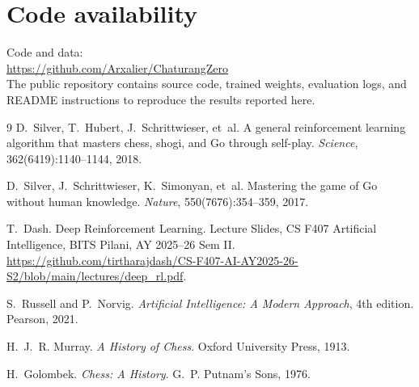 \documentclass[11pt,a4paper,twocolumn]{article}
\newcommand{\githuburl}{https://github.com/Arxalier/ChaturangZero}
\begin{document}
\section*{Code availability}
\noindent Code and data:\\
\url{\githuburl}\\
The public repository contains source code, trained weights, evaluation logs, and README instructions to reproduce the results reported here.

\begin{thebibliography}{9}
\small
{}
D.~Silver, T.~Hubert, J.~Schrittwieser, et~al.
\newblock A general reinforcement learning algorithm that masters chess, shogi, and Go through self-play.
\newblock \emph{Science}, 362(6419):1140--1144, 2018.

D.~Silver, J.~Schrittwieser, K.~Simonyan, et~al.
\newblock Mastering the game of Go without human knowledge.
\newblock \emph{Nature}, 550(7676):354--359, 2017.

T.~Dash.
\newblock Deep Reinforcement Learning.
\newblock Lecture Slides, CS F407 Artificial Intelligence, BITS Pilani, AY 2025--26 Sem II.
\newblock \url{https://github.com/tirtharajdash/CS-F407-AI-AY2025-26-S2/blob/main/lectures/deep_rl.pdf}.

S.~Russell and P.~Norvig.
\newblock \emph{Artificial Intelligence: A Modern Approach}, 4th edition.
\newblock Pearson, 2021.

H.~J.~R. Murray.
\newblock \emph{A History of Chess}.
\newblock Oxford University Press, 1913.

H.~Golombek.
\newblock \emph{Chess: A History}.
\newblock G.~P. Putnam's Sons, 1976.
\end{thebibliography}
\end{document}
